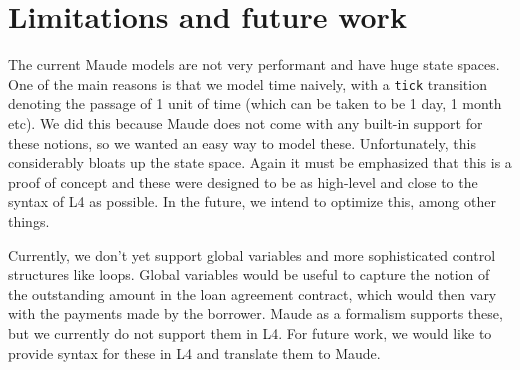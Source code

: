 \documentclass{article}
\begin{document}
\section{Limitations and future work}
The current Maude models are not very performant and have huge state spaces.
One of the main reasons is that we model time naively, with a \texttt{tick}
transition denoting the passage of 1 unit of time (which can be taken to be
1 day, 1 month etc).
We did this because Maude does not come with any built-in support for these notions,
so we wanted an easy way to model these.
Unfortunately, this considerably bloats up the state space.
Again it must be emphasized that this is a proof of concept and these were
designed to be as high-level and close to the syntax of L4 as possible.
In the future, we intend to optimize this, among other things.

Currently, we don't yet support global variables and more sophisticated control
structures like loops.
Global variables would be useful to capture the notion of the outstanding amount
in the loan agreement contract, which would then vary with the payments made by
the borrower.
Maude as a formalism supports these, but we currently do not support them in L4.
For future work, we would like to provide syntax for these in L4 and translate
them to Maude.

\newpage



\end{document}

